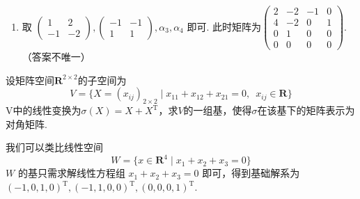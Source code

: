 \begin{exercise}
\begin{exgroup}
\begin{answer}
\begin{enumerate}
                \item 取 $ \begin{pmatrix} 1 & 2 \\ -1 & -2 \end{pmatrix}, \begin{pmatrix} -1 & -1 \\ 1 & 1 \end{pmatrix}, \alpha_3, \alpha_4 $ 即可. 此时矩阵为$ \begin{pmatrix}
                              2 & -2 & -1 & 0 \\
                              4 & -2 & 0  & 1 \\
                              0 & 1  & 0  & 0 \\
                              0 & 0  & 0  & 0
                          \end{pmatrix} $. （答案不唯一）
            \end{enumerate}
        \end{answer}

        \item 设矩阵空间$\mathbf{R}^{2\times 2}$的子空间为
        \[V=\{X=(x_{ij})_{2\times 2} \mid x_{11}+x_{12}+x_{21}=0,\enspace x_{ij}\in \mathbf{R}\}\]
        V中的线性变换为$\sigma(X)=X+X^\mathrm{T}$，求$V$的一组基，使得$\sigma$在该基下的矩阵表示为对角矩阵.

        \begin{answer}
            我们可以类比线性空间
          \[ W = \{ x \in \mathbf{R}^4 \mid x_1 + x_2 + x_3 = 0 \} \]
          $ W $ 的基只需求解线性方程组 $ x_1 + x_2 + x_3 = 0 $ 即可，得到基础解系为 $ (-1, 0, 1, 0)^{\mathrm{T}},\allowbreak (-1, 1, 0, 0)^{\mathrm{T}},\allowbreak (0, 0, 0, 1)^{\mathrm{T}} $.


\end{answer}
\end{exgroup}
\end{exercise}
